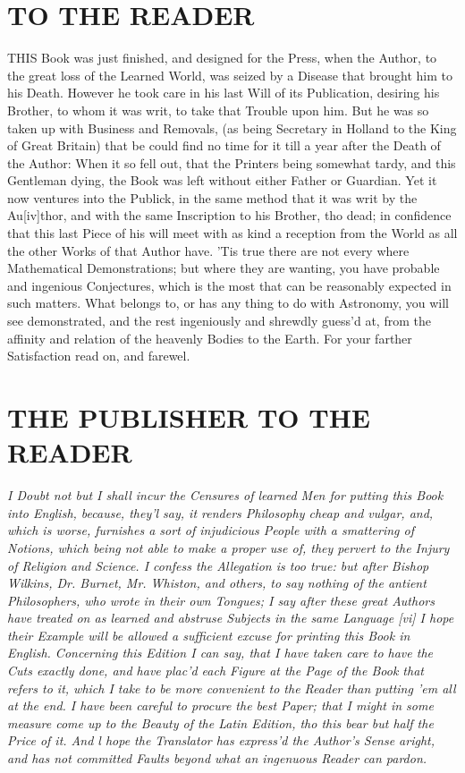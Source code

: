\documentclass[letterpaper]{book}
\begin{document}
\chapter{TO THE READER} %
\label{sec:TO THE READER}
THIS Book was just finished, and designed for the Press, when the Author,
to the great loss of the Learned World, was seized by a Disease that brought
him to his Death. However he took care in his last Will of its Publication,
desiring his Brother, to whom it was writ, to take that Trouble upon him.
But he was so taken up with Business and Removals, (as being Secretary in
Holland to the King of Great Britain) that be could find no time for it till
a year after the Death of the Author: When it so fell out, that the Printers
being somewhat tardy, and this Gentleman dying, the Book was left without
either Father or Guardian. Yet it now ventures into the Publick, in the same
method that it was writ by the Au[iv]thor, and with the same Inscription to
his Brother, tho dead; in confidence that this last Piece of his will meet with
as kind a reception from the World as all the other Works of that Author
have. 'Tis true there are not every where Mathematical Demonstrations; but
where they are wanting, you have probable and ingenious Conjectures, which
is the most that can be reasonably expected in such matters. What belongs
to, or has any thing to do with Astronomy, you will see demonstrated, and
the rest ingeniously and shrewdly guess'd at, from the affinity and relation
of the heavenly Bodies to the Earth. For your farther Satisfaction read on,
and farewel.

\chapter{THE PUBLISHER TO THE READER} 

\emph{ I Doubt not but I shall incur the Censures of learned Men for putting
this Book into English, because, they'l say, it renders Philosophy cheap and
vulgar, and, which is worse, furnishes a sort of injudicious People with a
smattering of Notions, which being not able to make a proper use of, they
pervert to the Injury of Religion and Science. I confess the Allegation is
too true: but after Bishop Wilkins, Dr. Burnet, Mr. Whiston, and others, to
say nothing of the antient Philosophers, who wrote in their own Tongues; I
say after these great Authors have treated on as learned and abstruse
Subjects in the same Language [vi] I hope their Example will be allowed a
sufficient excuse for printing this Book in English.  Concerning this
Edition I can say, that I have taken care to have the Cuts exactly done, and
have plac'd each Figure at the Page of the Book that refers to it, which I
take to be more convenient to the Reader than putting 'em all at the end.  I
have been careful to procure the best Paper; that I might in some measure
come up to the Beauty of the Latin Edition, tho this bear but half the Price
of it.  And l hope the Translator has express'd the Author's Sense aright,
and has not committed Faults beyond what an ingenuous Reader can pardon.}
\end{document}
